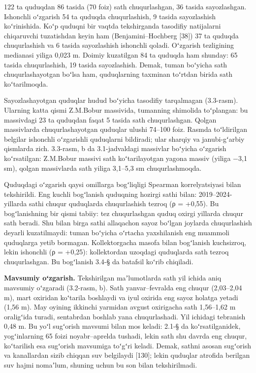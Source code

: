 122 ta quduqdan 86 tasida (70 foiz) sath chuqurlashgan, 36 tasida
sayozlashgan. Ishonchli oʻzgarish 54 ta quduqda chuqurlashish, 9 tasida
sayozlashish koʻrinishida. Koʻp quduqni bir vaqtda tekshirganda
tasodifiy natijalarni chiqaruvchi tuzatishdan keyin ham
(Benjamini--Hochberg {[}38{]}) 37 ta quduqda chuqurlashish va 6 tasida
sayozlashish ishonchli qoladi. Oʻzgarish tezligining medianasi yiliga
0,023 m. Doimiy kuzatilgan 84 ta quduqda ham shunday: 65 tasida
chuqurlashish, 19 tasida sayozlashish. Demak, tuman boʻyicha sath
chuqurlashayotgan boʻlsa ham, quduqlarning taxminan toʻrtdan birida sath
koʻtarilmoqda.

Sayozlashayotgan quduqlar hudud boʻyicha tasodifiy tarqalmagan
(3.3-rasm). Ularning katta qismi Z.M.Bobur massivida, tumanning
shimolida toʻplangan: bu massivdagi 23 ta quduqdan faqat 5 tasida sath
chuqurlashgan. Qolgan massivlarda chuqurlashayotgan quduqlar ulushi
74--100 foiz. Rasmda toʻldirilgan belgilar ishonchli oʻzgarishli
quduqlarni bildiradi; ular sharqiy va janubi-gʻarbiy qismlarda zich.
3.3-rasm, b da 3.1-jadvaldagi massivlar boʻyicha oʻzgarish koʻrsatilgan:
Z.M.Bobur massivi sath koʻtarilayotgan yagona massiv (yiliga −3,1 sm),
qolgan massivlarda sath yiliga 3,1--5,3 sm chuqurlashmoqda.



Quduqdagi oʻzgarish qaysi omillarga bogʻliqligi Spearman korrelyatsiyasi
bilan tekshirildi. Eng kuchli bogʻlanish quduqning hozirgi sathi bilan:
2019--2024-yillarda sathi chuqur quduqlarda chuqurlashish tezroq (ρ =
+0,55). Bu bogʻlanishning bir qismi tabiiy: tez chuqurlashgan quduq
oxirgi yillarda chuqur sath beradi. Shu bilan birga sathi allaqachon
sayoz boʻlgan joylarda chuqurlashish deyarli kuzatilmaydi: tuman
boʻyicha oʻrtacha yaxshilanish eng muammoli quduqlarga yetib bormagan.
Kollektorgacha masofa bilan bogʻlanish kuchsizroq, lekin ishonchli (ρ =
+0,25): kollektordan uzoqdagi quduqlarda sath tezroq chuqurlashgan. Bu
bogʻlanish 3.4-§ da batafsil koʻrib chiqiladi.

\textbf{Mavsumiy oʻzgarish.} Tekshirilgan maʼlumotlarda sath yil ichida
aniq mavsumiy oʻzgaradi (3.2-rasm, b). Sath yanvar--fevralda eng chuqur
(2,03--2,04 m), mart oxiridan koʻtarila boshlaydi va iyul oxirida eng
sayoz holatga yetadi (1,56 m). May oyining ikkinchi yarmidan avgust
oxirigacha sath 1,56--1,62 m oraligʻida turadi, sentabrdan boshlab yana
chuqurlashadi. Yil ichidagi tebranish 0,48 m. Bu yoʻl sugʻorish mavsumi
bilan mos keladi: 2.1-§ da koʻrsatilganidek, yogʻinlarning 65 foizi
noyabr--aprelda tushadi, lekin sath shu davrda eng chuqur, koʻtarilish
esa sugʻorish mavsumiga toʻgʻri keladi. Demak, sathni asosan sugʻorish
va kanallardan sizib chiqqan suv belgilaydi {[}130{]}; lekin quduqlar
atrofida berilgan suv hajmi nomaʼlum, shuning uchun bu son bilan
tekshirilmadi.


